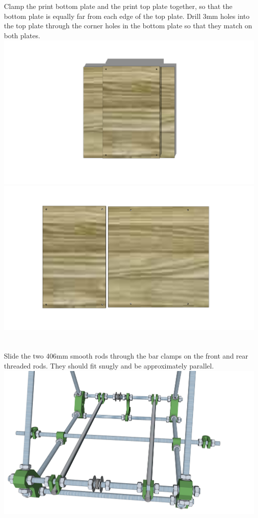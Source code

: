 \documentclass[twoside,a4paper,titlepage]{memoir}
\begin{document}
	\section{}
	Clamp the print bottom plate and the print top plate together, so that the bottom plate is equally far from
	each edge of the top plate. Drill 3mm holes into the top plate through the corner holes in the bottom
	plate so that they match on both plates.\\
	\includegraphics[width=1\linewidth]{graphics/ch6_3_1.png}
	\includegraphics[width=1\linewidth]{graphics/ch6_3_2.png}
	
	\section{}
	Slide the two 406mm smooth rods through the bar clamps on the front and rear threaded rods. They
	should fit snugly and be approximately parallel.\\
	\includegraphics[width=1\linewidth]{graphics/ch6_4.png}
	
\end{document}
